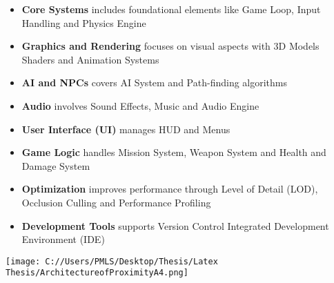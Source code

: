 \begin{itemize}
	\item \textbf{Core Systems} includes foundational elements like Game Loop, Input Handling and Physics Engine
	\item \textbf{Graphics and Rendering} focuses on visual aspects with 3D Models Shaders and Animation Systems
	\item \textbf{AI and NPCs} covers AI System and Path-finding algorithms
	\item \textbf{Audio} involves Sound Effects, Music and Audio Engine
	\item \textbf{User Interface (UI)} manages HUD and Menus
	\item \textbf{Game Logic} handles Mission System, Weapon System and Health and Damage System
	\item \textbf{Optimization} improves performance through	 Level of Detail (LOD), Occlusion Culling and	Performance Profiling
	\item \textbf{Development Tools} supports Version Control Integrated Development Environment (IDE)
\end{itemize}

\texttt{[image: C://Users/PMLS/Desktop/Thesis/Latex Thesis/ArchitectureofProximityA4.png]}

